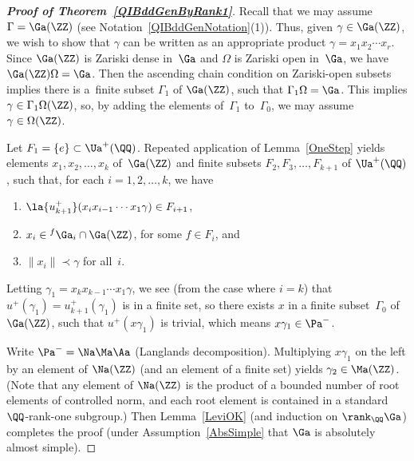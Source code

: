 \begin{proof}[\bf Proof of Theorem~\ref{QIBddGenByRank1}]
Recall that we may assume $\Gamma = \Ga(\ZZ)$ (see Notation~\ref{QIBddGenNotation}(1)).
Thus, given $\gamma \in \Ga(\ZZ)$, we wish to show that $\gamma$ can be written as an appropriate product $\gamma = x_1 x_2 \cdots x_r$. Since $\Ga(\ZZ)$ is Zariski dense in~$\Ga$ \cite[Theorem~4.10, p.~205]{MR1278263} and $\Omega$ is Zariski open in~$\Ga$, we have $\Ga(\ZZ) \Omega = \Ga$. Then the ascending chain condition on Zariski-open subsets implies there is a~finite subset $\Gamma_1$ of $\Ga(\ZZ)$, such that $\Gamma_1 \Omega = \Ga$. This implies $\gamma \in \Gamma_1 \Omega(\ZZ)$, so, by adding the elements of~$\Gamma_1$ to~$\Gamma_0$, we may assume $\gamma \in \Omega(\ZZ)$.

Let $F_1 = \{e\} \subset \Ua^+(\QQ)$. Repeated application of Lemma~\ref{OneStep} yields elements $x_1,x_2,\ldots,x_k$ of~$\Ga(\ZZ)$ and finite subsets $F_2, F_3,\ldots, F_{k+1}$ of $\Ua^+(\QQ)$, such that, for each $i = 1,2,\ldots,k$, we have
\begin{enumerate}\itemsep=0pt
\item[1)] $\la{u^+_{k+1}}(x_i x_{i-1} \cdots x_1 \gamma) \in F_{i+1}$,
\item[2)] $x_i \in {}^f \Ga_i \cap \Ga(\ZZ)$, for some $f \in F_{i}$, and
\item[3)] $\| x_i \| \prec \gamma$ for all~$i$.
	\end{enumerate}
Letting $\gamma_1 = x_k x_{k-1} \cdots x_1 \gamma$, we see (from the case where $i = k$) that $u^+(\gamma_1) = u^+_{k+1}(\gamma_1)$ is in a finite set, so there exists $x$ in a finite subset~$\Gamma_0$ of $\Ga(\ZZ)$, such that $u^+(x\gamma_1)$ is trivial, which means $x \gamma_1 \in \Pa^-$.

Write $\Pa^- = \Na \Ma \Aa$ (Langlands decomposition). Multiplying $x \gamma_1$ on the left by an element of $\Na(\ZZ)$ (and an element of a finite set) yields $\gamma_2 \in \Ma(\ZZ)$. (Note that any element of $\Na(\ZZ)$ is the product of a bounded number of root elements of controlled norm, and each root element is contained in a standard $\QQ$-rank-one subgroup.) Then Lemma~\ref{LeviOK} (and induction on $\rank_\QQ \Ga$) completes the proof (under Assumption~\ref{AbsSimple} that $\Ga$ is absolutely almost simple).
\end{proof}
